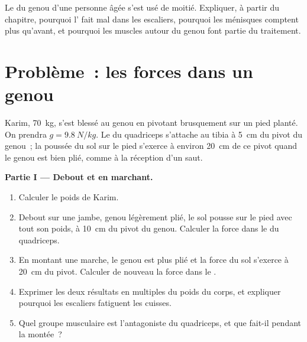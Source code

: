 \begin{exercise}[$\star\star\star$]\label{exo:g10:muscles-and-joints:15}
Le  du genou d'une personne âgée s'est usé de moitié.
Expliquer, à partir du chapitre, pourquoi l' fait mal dans
les escaliers, pourquoi les ménisques comptent plus qu'avant, et
pourquoi les muscles autour du genou font partie du traitement.
\end{exercise}

\section{Problème~: les forces dans un genou}

\begin{problem}
\label{pb:g10:muscles-and-joints:1}
Karim, \qty{70}{kg}, s'est blessé au genou en pivotant brusquement sur
un pied planté. On prendra $g = \qty{9.8}{N/kg}$. Le  du
quadriceps s'attache au tibia à \qty{5}{cm} du pivot du genou~; la
poussée du sol sur le pied s'exerce à environ \qty{20}{cm} de ce pivot
quand le genou est bien plié, comme à la réception d'un saut.

\medskip
\noindent\textbf{Partie I --- Debout et en marchant.}
\begin{enumerate}
  \item Calculer le poids de Karim.
  \item Debout sur une jambe, genou légèrement plié, le sol pousse sur
        le pied avec tout son poids, à \qty{10}{cm} du pivot du genou.
        Calculer la force dans le  du quadriceps.
  \item En montant une marche, le genou est plus plié et la force du
        sol s'exerce à \qty{20}{cm} du pivot. Calculer de nouveau la
        force dans le .
  \item Exprimer les deux résultats en multiples du poids du corps, et
        expliquer pourquoi les escaliers fatiguent les cuisses.
  \item Quel groupe musculaire est l'antagoniste du quadriceps, et que
        fait-il pendant la montée~?
\end{enumerate}


\end{problem}

